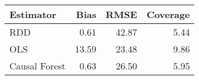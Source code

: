 \begin{table}[ht]
\centering
\begin{tabular}{lrrr}
  \hline
Estimator & Bias & RMSE & Coverage \\ 
  \hline
RDD & 0.61 & 42.87 & 5.44 \\ 
  OLS & 13.59 & 23.48 & 9.86 \\ 
  Causal Forest & 0.63 & 26.50 & 5.95 \\ 
   \hline
\end{tabular}
\end{table}
